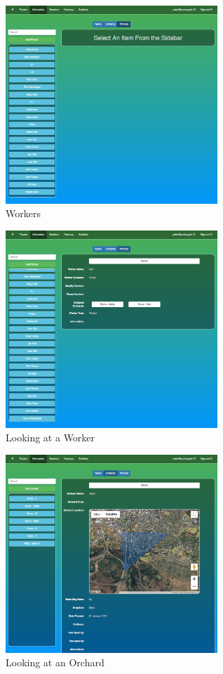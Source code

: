 \documentclass[11pt]{article}
\begin{document}
\begin{figure}
 \centering
 \includegraphics[width=8cm, keepaspectratio]{Images/UsingSystem/WebWorkers.png}
 \caption{Workers}
 \label{InformationPageWorkers}
\end{figure}

\begin{figure}
 \centering
 \includegraphics[width=8cm, keepaspectratio]{Images/UsingSystem/WebWorker.png}
 \caption{Looking at a Worker}
 \label{InformationPageJoe}
\end{figure}

\begin{figure}
 \centering
 \includegraphics[width=8cm, keepaspectratio]{Images/UsingSystem/WebOrchard.png}
 \caption{Looking at an Orchard}
 \label{InformationPagePear}
\end{figure}
\end{document}
